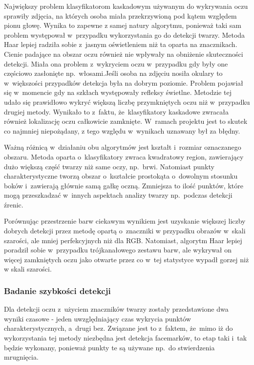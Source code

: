 Największy problem klasyfikatorom kaskadowym używanym do wykrywania oczu sprawiły zdjęcia, na których osoba miała przekrzywioną pod kątem względem pionu głowę. Wynika to zapewne z samej natury algorytmu, ponieważ taki sam problem występował w~przypadku wykorzystania go do detekcji twarzy. Metoda Haar lepiej radziła sobie z~jasnym oświetleniem niż ta oparta na znacznikach. Cienie padające na obszar oczu również nie wpływały na obniżenie skuteczności detekcji. Miała ona problem z~wykryciem oczu w~przypadku gdy były one częściowo zasłonięte np.~włosami.Jeśli osoba na zdjęciu nosiła okulary to w~większości przypadków detekcja była na dobrym poziomie. Problem pojawiał się w~momencie gdy na szkłach występowały refleksy świetlne. Metodzie tej udało się prawidłowo wykryć większą liczbę przymkniętych oczu niż w~przypadku drugiej metody. Wynikało to z~faktu, że~klasyfikatory kaskadowe zwracała również lokalizację oczu całkowicie zamknięte. W~ramach projektu jest to skutek co najmniej niepożądany, z tego względu w~wynikach uznawany był za błędny. 



\vspace{5mm}

Ważną różnicą w~działaniu obu algorytmów jest kształt i~rozmiar oznaczanego obszaru. Metoda oparta o~klasyfikatory zwraca kwadratowy region, zawierający dużo większą część twarzy niż same oczy, np.~brwi. Natomiast punkty charakterystyczne tworzą obszar o~kształcie prostokąta o~dowolnym stosunku boków i~zawierają głównie samą gałkę oczną. Zmniejsza to ilość punktów, które mogą przeszkadzać w~innych aspektach analizy twarzy np.~podczas detekcji źrenic.

\vspace{5mm}

Porównując przestrzenie barw ciekawym wynikiem jest uzyskanie większej liczby dobrych detekcji przez metodę opartą o~znaczniki w przypadku obrazów w~skali szarości, ale mniej perfekcyjnych niż dla RGB. Natomiast, algorytm Haar lepiej poradził sobie w~przypadku trójkanałowego zestawu barw, ale wykrywał on więcej zamkniętych oczu jako otwarte przez co w~tej statystyce wypadł gorzej niż w skali szarości. 




\subsubsection{Badanie szybkości detekcji} \label{section:eye_detection_speed_img}

Dla detekcji oczu z~użyciem znaczników twarzy zostały przedstawione dwa wyniki czasowe - jeden uwzględniający czas wykrycia punktów charakterystycznych, a~drugi bez. Związane jest to z~faktem, że~mimo iż do wykorzystania tej metody niezbędna jest detekcja facemarków, to etap taki i~tak będzie wykonany, ponieważ punkty te są używane np.~do stwierdzenia mrugnięcia. 


